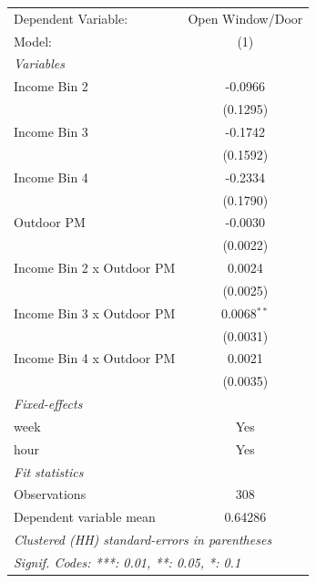 
\begingroup
\centering
\begin{tabular}{lc}
   \tabularnewline \midrule \midrule
   Dependent Variable:       & Open Window/Door\\  
   Model:                    & (1)\\  
   \midrule
   \emph{Variables}\\
   Income Bin 2              & -0.0966\\   
                             & (0.1295)\\   
   Income Bin 3              & -0.1742\\   
                             & (0.1592)\\   
   Income Bin 4              & -0.2334\\   
                             & (0.1790)\\   
   Outdoor PM                & -0.0030\\   
                             & (0.0022)\\   
   Income Bin 2 x Outdoor PM & 0.0024\\   
                             & (0.0025)\\   
   Income Bin 3 x Outdoor PM & 0.0068$^{**}$\\   
                             & (0.0031)\\   
   Income Bin 4 x Outdoor PM & 0.0021\\   
                             & (0.0035)\\   
   \midrule
   \emph{Fixed-effects}\\
   week                      & Yes\\  
   hour                      & Yes\\  
   \midrule
   \emph{Fit statistics}\\
   Observations              & 308\\  
   Dependent variable mean   & 0.64286\\  
   \midrule \midrule
   \multicolumn{2}{l}{\emph{Clustered (HH) standard-errors in parentheses}}\\
   \multicolumn{2}{l}{\emph{Signif. Codes: ***: 0.01, **: 0.05, *: 0.1}}\\
\end{tabular}
\par\endgroup


